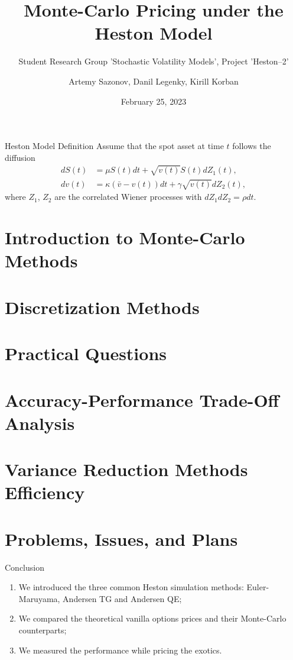 \documentclass[aspectratio=169]{beamer}
\subtitle{Student Research Group 'Stochastic Volatility Models', Project 'Heston--2'}
\title{Monte-Carlo Pricing under the Heston Model}
\author{Artemy Sazonov, Danil Legenky, Kirill Korban}
\institute{Lomonosov Moscow State Univesity, Faculty of Mechanics and Mathematics}
\date{February 25, 2023}
\begin{document}
    \maketitle

    \begin{frame}{Heston Model Definition}
        Assume that the spot asset at time $t$ follows the diffusion
        \begin{align}
            dS(t) & = \mu S(t)dt + \sqrt{v(t)} S(t) dZ_1(t), \label{Heston:price}\\
            dv(t) & = \kappa\left(\bar v -  v(t)\right) dt + \gamma\sqrt{v(t)} dZ_2(t), \label{Heston:variance}
        \end{align}
        where $Z_1$, $Z_2$ are the correlated Wiener processes with $dZ_1dZ_2 = \rho dt$.
    \end{frame}

    \section{Introduction to Monte-Carlo Methods}
        

    \section{Discretization Methods}
        

    \section{Practical Questions}
        

    \section{Accuracy-Performance Trade-Off Analysis}
        

    \section{Variance Reduction Methods Efficiency}
        

    \section{Problems, Issues, and Plans}
        \begin{frame}{Conclusion}
            \begin{enumerate}
                \item We introduced the three common Heston simulation methods: Euler-Maruyama, Andersen TG and Andersen QE; 
                \item We compared the theoretical vanilla options prices and their Monte-Carlo counterparts;
                \item We measured the performance while pricing the exotics.
            \end{enumerate}
        \end{frame}
        
\end{document}
